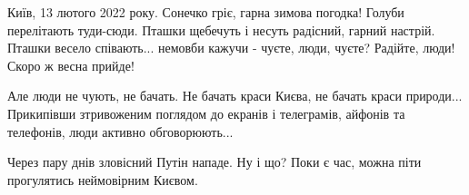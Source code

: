  
 
 
 
 

Київ, 13 лютого 2022 року. Сонечко гріє, гарна зимова погодка! Голуби
перелітають туди-сюди. Пташки щебечуть і несуть радісний, гарний настрій.
Пташки весело співають... немовби кажучи - чуєте, люди, чуєте? Радійте, люди!
Скоро ж весна прийде!

Але люди не чують, не бачать. Не бачать краси Києва, не бачать краси природи...
Прикипівши зтривоженим поглядом до екранів і телеграмів, айфонів та телефонів,
люди активно обговорюють... 

Через пару днів зловісний Путін нападе. Ну і що? Поки є час, можна піти
прогулятись неймовірним Києвом. 
